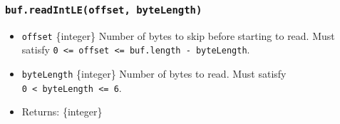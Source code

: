 \begin{Shaded}
\begin{Highlighting}[]
\NormalTok{ \{ }\NormalTok{ \} }\OperatorTok{=} \NormalTok{(}\NormalTok{)}\OperatorTok{;}

\OperatorTok{=} \NormalTok{([}\OperatorTok{,} \OperatorTok{,} \OperatorTok{,} \OperatorTok{,} \OperatorTok{,} \NormalTok{])}\OperatorTok{;}

\NormalTok{(}\OperatorTok{,} \NormalTok{)}\NormalTok{(}\NormalTok{))}\OperatorTok{;}
\NormalTok{(}\OperatorTok{,} \NormalTok{)}\NormalTok{(}\NormalTok{))}\OperatorTok{;}
\NormalTok{(}\OperatorTok{,} \NormalTok{)}\NormalTok{(}\NormalTok{))}\OperatorTok{;}
\end{Highlighting}
\end{Shaded}

\subsubsection{\texorpdfstring{\texttt{buf.readIntLE(offset,\ byteLength)}}{buf.readIntLE(offset, byteLength)}}\label{buf.readintleoffset-bytelength}

\begin{itemize}
\tightlist
\item
  \texttt{offset} \{integer\} Number of bytes to skip before starting to
  read. Must satisfy
  \texttt{0\ \textless{}=\ offset\ \textless{}=\ buf.length\ -\ byteLength}.
\item
  \texttt{byteLength} \{integer\} Number of bytes to read. Must satisfy
  \texttt{0\ \textless{}\ byteLength\ \textless{}=\ 6}.
\item
  Returns: \{integer\}
\end{itemize}

